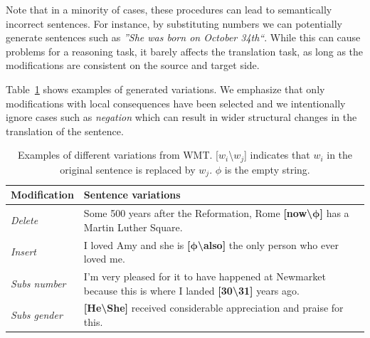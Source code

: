 Note that in a minority of cases, these procedures can lead to semantically incorrect sentences.
For instance, by substituting numbers we can potentially generate sentences such as \textit{''She was born on October 34th``}. 
While this can cause problems for a reasoning task, it barely affects the translation task, as long as the modifications are consistent on the source and target side. 


Table~\ref{examplesofpert} shows examples of generated variations. %
We emphasize that only modifications with local consequences have been selected and we intentionally ignore cases such as \textit{negation} which can result in wider structural changes in the translation of the sentence.

\begin{table}[ht]
\begin{center}\small
\setlength\tabcolsep{4pt} %
\caption{\label{examplesofpert} Examples of different variations from WMT. [$w_i$\textbackslash$w_j$] indicates that $w_i$ in the original sentence is replaced by $w_j$. ${\phi}$ is the empty string.}
\begin{tabularx}{0.9\columnwidth}{lX}
\toprule
\bf Modification & \bf Sentence variations\\
\midrule
\textit{Delete} &  Some 500 years after the Reformation, Rome  \textbf{[now\textbackslash$\pmb{\phi}$]} has a Martin Luther Square. \\
\textit{Insert} & I loved Amy and she is  \textbf{[$\pmb{\phi}$\textbackslash also]} the only person who ever loved me.  \\
\textit{Subs number} & I'm very pleased for it to have happened at Newmarket because this is where I landed \textbf{[30\textbackslash31]} years ago. \\
\textit{Subs gender} & \textbf{[He\textbackslash She]} received considerable appreciation and praise for this. \\
\bottomrule
\end{tabularx}
\end{center}
\end{table} 

